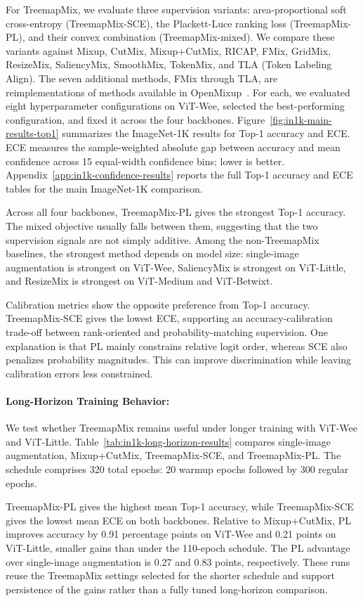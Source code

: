For TreemapMix, we evaluate three supervision variants: area-proportional soft cross-entropy (TreemapMix-SCE), the Plackett-Luce ranking loss (TreemapMix-PL), and their convex combination (TreemapMix-mixed). We compare these variants against Mixup, CutMix, Mixup+CutMix, RICAP, FMix, GridMix, ResizeMix, SaliencyMix, SmoothMix, TokenMix, and TLA (Token Labeling Align).
The seven additional methods, FMix through TLA, are reimplementations of
methods available in OpenMixup~\citep{liOpenMixupOpenMixup2024}. For each,
we evaluated eight hyperparameter configurations on ViT-Wee, selected the
best-performing configuration, and fixed it across the four backbones.
Figure~\ref{fig:in1k-main-results-top1} summarizes the ImageNet-1K
results for Top-1 accuracy and ECE. ECE measures the sample-weighted absolute
gap between accuracy and mean confidence across 15 equal-width confidence bins;
lower is better. Appendix~\ref{app:in1k-confidence-results} reports the full Top-1 accuracy
and ECE tables for the main ImageNet-1K comparison.

Across all four backbones, TreemapMix-PL gives the strongest Top-1 accuracy. The mixed objective usually falls between them, suggesting that the two supervision signals are not simply additive. Among the non-TreemapMix baselines, the strongest method depends on model size: single-image augmentation is strongest on ViT-Wee, SaliencyMix is strongest on ViT-Little, and ResizeMix is strongest on ViT-Medium and ViT-Betwixt.

Calibration metrics show the opposite preference from Top-1 accuracy.
TreemapMix-SCE gives the lowest ECE, supporting an accuracy-calibration
trade-off between rank-oriented and probability-matching supervision.
One explanation is that PL mainly constrains relative logit order, whereas SCE also penalizes probability magnitudes. This can improve discrimination while leaving calibration errors less constrained.

\paragraph{Long-Horizon Training Behavior:}
\label{sec:long-horizon}
We test whether TreemapMix remains useful under longer training with
ViT-Wee and ViT-Little. Table~\ref{tab:in1k-long-horizon-results} compares
single-image augmentation, Mixup+CutMix, TreemapMix-SCE, and TreemapMix-PL. The schedule comprises 320 total epochs:
20 warmup epochs followed by 300 regular epochs.

TreemapMix-PL gives the highest mean Top-1 accuracy, while TreemapMix-SCE
gives the lowest mean ECE on both backbones. Relative to Mixup+CutMix,
PL improves accuracy by 0.91 percentage points on ViT-Wee and 0.21 points
on ViT-Little, smaller gains than under the 110-epoch schedule. The PL
advantage over single-image augmentation is 0.27 and 0.83 points,
respectively. These runs reuse the TreemapMix settings selected for the
shorter schedule and support persistence of the gains rather than a fully
tuned long-horizon comparison.

